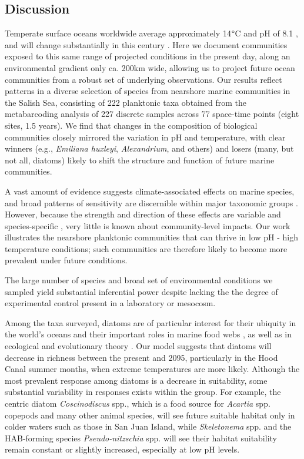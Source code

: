 \documentclass[11pt]{article}
\begin{document}
\begin{linenumbers}
\subsection*{Discussion}

Temperate surface oceans worldwide average approximately 14$\degree$C and pH of 8.1 \cite{bopp2013multiple}, and will change substantially in this century \citep[mean $\Delta$ T 2.5$\degree$C, $\Delta$ pH -0.35 globally; RCP 8.5;][]{gattuso2015contrasting}.  Here we document communities exposed to this same range of projected conditions in the present day, along an environmental gradient only ca. 200km wide, allowing us to project future ocean communities from a robust set of underlying observations. Our results reflect patterns in a diverse selection of species from nearshore marine communities in the Salish Sea, consisting of 222 planktonic taxa obtained from the metabarcoding analysis of 227 discrete samples across 77 space-time points (eight sites, 1.5 years). We find that changes in the composition of biological communities closely mirrored the variation in pH and temperature, with clear winners (e.g., \textit{Emiliana huxleyi}, \textit{Alexandrium}, and others) and losers (many, but not all, diatoms) likely to shift the structure and function of future marine communities.

A vast amount of evidence suggests climate-associated effects on marine species, and broad patterns of sensitivity are discernible within major taxonomic groups  \citep[][among many others]{gattuso2015contrasting, stock2017reconciling}. However, because the strength and direction of these effects are variable and species-specific \cite{kroeker2013impacts}, very little is known about community-level impacts. Our work illustrates the nearshore planktonic communities that can thrive in low pH - high temperature conditions; such communities are therefore likely to become more prevalent under future conditions. 

The large number of species and broad set of environmental conditions we sampled yield substantial inferential power despite lacking the the degree of experimental control present in a laboratory or mesocosm. 

Among the taxa surveyed, diatoms are of particular interest for their ubiquity in the world's oceans and their important roles in marine food webs \cite{armbrust2009life, wasmund2017diatom}, as well as in ecological and evolutionary theory \cite{margalef11978}. Our model suggests that diatoms will decrease in richness between the present and 2095, particularly in the Hood Canal summer months, when extreme temperatures are more likely. Although the most prevalent response among diatoms is a decrease in suitability, some substantial variability in responses exists within the group. For example, the centric diatom \textit{Coscinodiscus} spp., which is a food source for \textit{Acartia} spp. copepods \cite{jansen2008copepods} and many other animal species, will see future suitable habitat only in colder waters such as those in San Juan Island, while \textit{Skeletonema} spp. and the HAB-forming species \textit{Pseudo-nitzschia} spp. will see their habitat suitability remain constant or slightly increased, especially at low pH levels.


\end{linenumbers}
\end{document}
